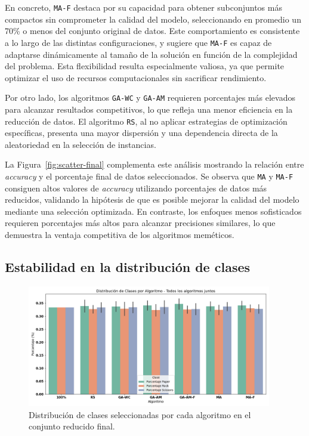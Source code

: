 En concreto, \texttt{MA-F} destaca por su capacidad para obtener subconjuntos más compactos sin comprometer la calidad del modelo,
seleccionando en promedio un 70\% o menos del conjunto original de datos.
Este comportamiento es consistente a lo largo de las distintas configuraciones,
y sugiere que \texttt{MA-F} es capaz de adaptarse dinámicamente al tamaño de la solución en función de la complejidad del problema.
Esta flexibilidad resulta especialmente valiosa, ya que permite optimizar el uso de recursos computacionales sin sacrificar rendimiento.

Por otro lado, los algoritmos \texttt{GA-WC} y \texttt{GA-AM} requieren porcentajes más elevados para alcanzar resultados competitivos,
lo que refleja una menor eficiencia en la reducción de datos.
El algoritmo \texttt{RS}, al no aplicar estrategias de optimización específicas,
presenta una mayor dispersión y una dependencia directa de la aleatoriedad en la selección de instancias.

La Figura~\ref{fig:scatter-final} complementa este análisis mostrando la relación entre \textit{accuracy} y el porcentaje final de datos seleccionados.
Se observa que \texttt{MA} y \texttt{MA-F} consiguen altos valores de \textit{accuracy} utilizando porcentajes de datos más reducidos,
validando la hipótesis de que es posible mejorar la calidad del modelo mediante una selección optimizada.
En contraste, los enfoques menos sofisticados requieren porcentajes más altos para alcanzar precisiones similares,
lo que demuestra la ventaja competitiva de los algoritmos meméticos.

\subsection{Estabilidad en la distribución de clases}\label{sec:distribucion-clases-final}
\begin{figure}[htp]
    \centering
    \includegraphics[width=0.95\textwidth]{imagenes/evaluaciones/final/distribucion-de-clases.png}
    \caption{Distribución de clases seleccionadas por cada algoritmo en el conjunto reducido final.}
    \label{fig:distribucion-de-clases-final}
\end{figure}

